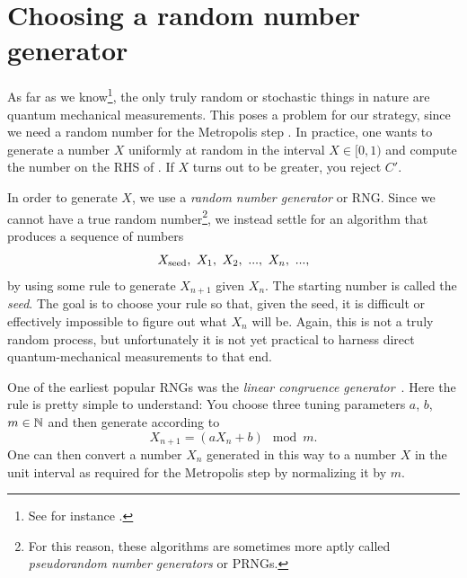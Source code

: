 \section{Choosing a random number generator}

As far as we know\footnote{See for instance .}, 
the only truly random or stochastic things in nature are
quantum mechanical measurements. This poses a problem for our strategy, since
we need a random number for the Metropolis step .
In practice, one wants to generate a number $X$ uniformly at random
in the interval $X\in[0,1)$ and compute the number on the RHS
of . If $X$ turns out to be greater, you reject $C'$.

In order to generate $X$, we use a {\it random number
generator} or RNG. 
Since we cannot have a true random number\footnote{For
this reason, these algorithms are sometimes more aptly called
{\it pseudorandom number generators}
or PRNGs.}, we instead settle for an algorithm that produces a sequence of numbers
\begin{equation}
  X_{\rm seed},~X_1,~X_2,~...,~X_n,~...,
\end{equation}
by using some rule to generate $X_{n+1}$ given $X_n$. The starting number is
called the {\it seed}. The goal is to choose your rule so that,
given the seed, it is difficult or effectively impossible to figure out what
$X_n$ will be. Again, this is not a truly random process, but unfortunately it
is not yet practical to harness direct quantum-mechanical measurements to that
end. 

One of the earliest popular RNGs was the {\it linear congruence
generator}~\cite{lehmer_mathematical_1951,thomson_modified_1958}. 
Here the rule is pretty simple
to understand: You choose three tuning parameters $a$, $b$, $m\in\mathbb{N}$
and then generate according to
\begin{equation}\label{eq:linearCongruence}
X_{n+1}=(aX_n+b)\mod m.
\end{equation}
One can then convert a number $X_n$ generated in this way to a number $X$
in the unit interval as required for the Metropolis step by normalizing it by $m$.


